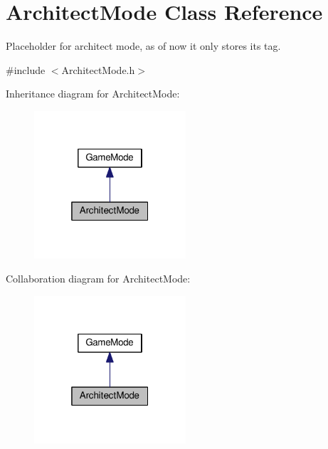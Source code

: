 \hypertarget{classArchitectMode}{\section{Architect\-Mode Class Reference}
\label{classArchitectMode}
}


Placeholder for architect mode, as of now it only stores its tag.  




{\ttfamily \#include $<$Architect\-Mode.\-h$>$}



Inheritance diagram for Architect\-Mode\-:
\nopagebreak
\begin{figure}[H]
\begin{center}
\leavevmode
\includegraphics[width=160pt]{classArchitectMode__inherit__graph}
\end{center}
\end{figure}


Collaboration diagram for Architect\-Mode\-:
\nopagebreak
\begin{figure}[H]
\begin{center}
\leavevmode
\includegraphics[width=160pt]{classArchitectMode__coll__graph}
\end{center}
\end{figure}
